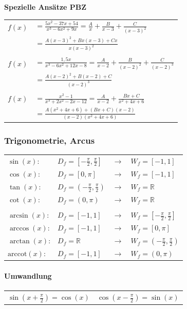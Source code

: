 			\textbf{Spezielle Ansätze PBZ} \\
				\begin{tabular}{ll}
					$f(x)$ & $=\frac{5x^2-37x+54}{x^3-6x^2+9x} =  \frac{A}{x}+\frac{B}{x-3}+\frac{C}{(x-3)^2}$ \\ 
					       & $=\frac{A(x-3)^2+Bx(x-3)+Cx}{x(x-3)^2}$ \\
					\\
					$f(x)$ & $=\frac{1,5x}{x^3-6x^2+12x-8}=\frac{A}{x-2}+\frac{B}{(x-2)^2}+\frac{C}{(x-2)^3}$ \\
					       & $=\frac{A(x-2)^2+B(x-2)+C}{(x-2)^3}$ \\
					\\
					$f(x)$ & $=\frac{x^2-1}{x^3+2x^2-2x-12}=\frac{A}{x-2}+\frac{Bx+C}{x^2+4x+6}$ \\
					       & $=\frac{A(x^2+4x+6)+(Bx+C)(x-2)}{(x-2)(x^2+4x+6)}$ \\
				\end{tabular}
		
		\subsubsection{Trigonometrie, Arcus}
			\begin{tabular}{llll}
				$\sin(x)$: & $D_f=[-\frac{\pi}{2},\frac{\pi}{2}]$ & $\rightarrow$ &  $W_f=[-1,1]$ \\
				$\cos(x)$: & $D_f=[0,\pi]$ & $\rightarrow$ &  $W_f=[-1,1]$  \\
				$\tan(x)$: & $D_f=(-\frac{\pi}{2},\frac{\pi}{2})$ & $\rightarrow$ & $W_f=\mathbb{R}$\\
				$\cot(x)$: & $D_f=(0,\pi)$ & $\rightarrow$ &  $W_f=\mathbb{R}$ \\
				\\
				$\arcsin(x)$: & $D_f=[-1,1] $ & $\rightarrow$ & $ W_f=[-\frac{\pi}{2},\frac{\pi}{2}]$ \\
				$\arccos(x)$: & $D_f=[-1,1]$ & $\rightarrow$ &  $W_f=[0,\pi]$ \\
				$\arctan(x)$: & $D_f=\mathbb{R}$ & $\rightarrow$ &  $W_f=(-\frac{\pi}{2},\frac{\pi}{2})$ \\
				$\mathrm{arccot}(x)$: & $D_f=[-1,1]$ & $\rightarrow$ &  $W_f=(0,\pi)$ \\		
			\end{tabular}

			\paragraph{Umwandlung}
				\begin{tabular}{ll}
					$\sin(x + \frac{\pi}{2}) = \cos(x)$ & $\cos(x - \frac{\pi}{2}) = \sin(x)$ \\	
				\end{tabular}
			
